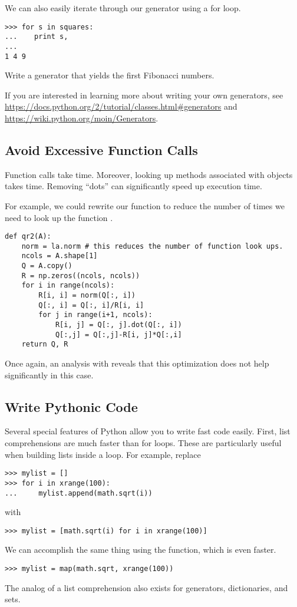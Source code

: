 We can also easily iterate through our generator using a for loop.
\begin{lstlisting}
>>> for s in squares:
...    print s,
...
1 4 9
\end{lstlisting}

\begin{problem}
Write a generator that yields the first  Fibonacci numbers.
\end{problem}

If you are interested in learning more about writing your own generators, see \url{https://docs.python.org/2/tutorial/classes.html#generators} and \url{https://wiki.python.org/moin/Generators}.

\subsection*{Avoid Excessive Function Calls}
Function calls take time.
Moreover, looking up methods associated with objects takes time.
Removing ``dots'' can significantly speed up execution time.

For example, we could rewrite our function to reduce the number of times we need to look up the function .

\begin{lstlisting}
def qr2(A):
    norm = la.norm # this reduces the number of function look ups.
    ncols = A.shape[1]
    Q = A.copy()
    R = np.zeros((ncols, ncols))
    for i in range(ncols):
        R[i, i] = norm(Q[:, i])
        Q[:, i] = Q[:, i]/R[i, i]
        for j in range(i+1, ncols):
            R[i, j] = Q[:, j].dot(Q[:, i])
            Q[:,j] = Q[:,j]-R[i, j]*Q[:,i]
    return Q, R
\end{lstlisting}
Once again, an analysis with  reveals that this optimization does not help significantly in this case.


\subsection*{Write Pythonic Code}
Several special features of Python allow you to write fast code easily.
First, list comprehensions are much faster than for loops. These are particularly useful when building lists inside a loop.
For example, replace
\begin{lstlisting}
>>> mylist = []
>>> for i in xrange(100):
...     mylist.append(math.sqrt(i))
\end{lstlisting}
with
\begin{lstlisting}
>>> mylist = [math.sqrt(i) for i in xrange(100)]
\end{lstlisting}
We can accomplish the same thing using the  function, which is even faster.
\begin{lstlisting}
>>> mylist = map(math.sqrt, xrange(100))
\end{lstlisting}
The analog of a list comprehension also exists for generators, dictionaries, and sets.

